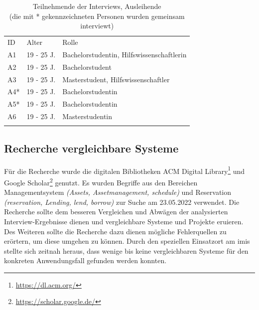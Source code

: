 \begin{table}[h]
        \centering
        \caption{Teilnehmende der Interviews, Ausleihende \\
                (die mit * gekennzeichneten Personen wurden gemeinsam interviewt)}
        \begin{tabular}{lll}
                \arrayrulecolor{maincolor}\hline
                \sffamily\color{maincolor}ID & \sffamily\color{maincolor}Alter &
                \sffamily\color{maincolor}Rolle                                                     \\
                \arrayrulecolor{maincolor}\hline
                A1                           & 19 - 25 J.                      & Bachelorstudentin,
                Hilfswissenschaftlerin                                                              \\
                A2                           & 19 - 25 J.                      & Bachelorstudent
                \\
                A3                           & 19 - 25 J.                      & Masterstudent,
                Hilfswissenschaftler                                                                \\
                A4*                          & 19 - 25 J.                      & Bachelorstudentin
                \\
                A5*                          & 19 - 25 J.                      & Bachelorstudentin
                \\
                A6                           & 19 - 25 J.                      & Masterstudentin
                \\
                \arrayrulecolor{maincolor}\hline
        \end{tabular}
        \label{table:a}
\end{table}

\subsection{Recherche vergleichbare Systeme}
\label{subsection:system}
Für die Recherche wurde die digitalen Bibliotheken ACM Digital
Library\footnote{\url{https://dl.acm.org/}} und Google
Scholar\footnote{\url{https://scholar.google.de/}} genutzt. Es wurden Begriffe aus den Bereichen
Managementsystem \textit{(Assets, Assetmanagement, schedule)} und Reservation \textit{(reservation,
Lending, lend, borrow)} zur Suche am 23.05.2022 verwendet. Die Recherche sollte dem besseren
Vergleichen und Abwägen der analysierten Interview-Ergebnisse dienen und vergleichbare Systeme und
Projekte eruieren. Des Weiteren sollte die Recherche dazu dienen mögliche Fehlerquellen zu erörtern,
um diese umgehen zu können. Durch den speziellen Einsatzort am \ac{imis} stellte sich zeitnah
heraus, dass wenige bis keine vergleichbaren Systeme für den konkreten Anwendungsfall gefunden
werden konnten. 

